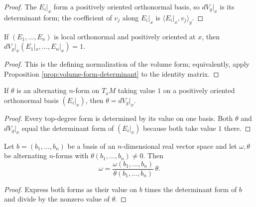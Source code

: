 \begin{proof}
\leanok
{}
\sketch The $E_i|_x$ form a positively oriented orthonormal basis, so $dV_g|_x$ is its determinant form; the coefficient of $v_j$ along $E_i|_x$ is $\langle E_i|_x,v_j\rangle_g$.
\end{proof}

\begin{proposition}
\label{prop:volume-form-value-one}
\leanok
{}
If $(E_1,\ldots,E_n)$ is local orthonormal and positively oriented at $x$, then $dV_g|_x(E_1|_x,\ldots,E_n|_x)=1$.
\end{proposition}

\begin{proof}
\leanok
{}
\sketch This is the defining normalization of the volume form; equivalently, apply Proposition \ref{prop:volume-form-determinant} to the identity matrix.
\end{proof}

\begin{proposition}[Uniqueness of $dV_g$]
\label{prop:volume-form-uniqueness}
\leanok
{}
If $\theta$ is an alternating $n$-form on $T_xM$ taking value $1$ on a positively oriented orthonormal basis $(E_i|_x)$, then $\theta=dV_g|_x$.
\end{proposition}

\begin{proof}
\leanok
{}
\sketch Every top-degree form is determined by its value on one basis. Both $\theta$ and $dV_g|_x$ equal the determinant form of $(E_i|_x)$ because both take value $1$ there.
\end{proof}

\begin{lemma}
\label{lem:top-forms-proportional}
\leanok
Let $b=(b_1,\ldots,b_n)$ be a basis of an $n$-dimensional real vector space and let $\omega,\theta$ be alternating $n$-forms with $\theta(b_1,\ldots,b_n)\ne0$. Then
\[
\omega=\frac{\omega(b_1,\ldots,b_n)}{\theta(b_1,\ldots,b_n)}\,\theta.
\]
\end{lemma}

\begin{proof}
\leanok
\sketch Express both forms as their value on $b$ times the determinant form of $b$ and divide by the nonzero value of $\theta$.
\end{proof}

